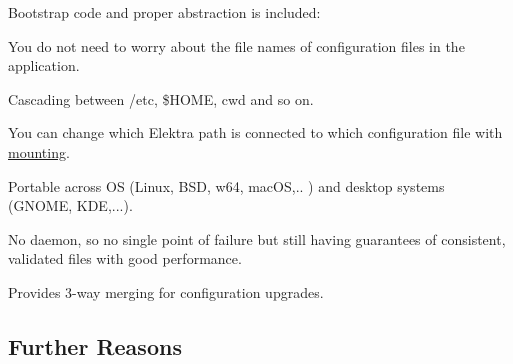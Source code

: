 \begin{DoxyItemize}
\item Bootstrap code and proper abstraction is included\+:
\begin{DoxyItemize}
\item You do not need to worry about the file names of configuration files in the application.
\item Cascading between {\ttfamily /etc}, {\ttfamily \$\+H\+O\+ME}, {\ttfamily cwd} and so on.
\item You can change which Elektra path is connected to which configuration file with \hyperlink{md_doc_help_elektra-mounting_doc_help_elektra-mounting_md}{mounting}.
\item Portable across OS (Linux, B\+SD, w64, mac\+OS,.. ) and desktop systems (G\+N\+O\+ME, K\+DE,...).
\end{DoxyItemize}
\item No daemon, so no single point of failure but still having guarantees of consistent, validated files with good performance.
\item Provides 3-\/way merging for configuration upgrades.
\end{DoxyItemize}

\subsection*{Further Reasons}


